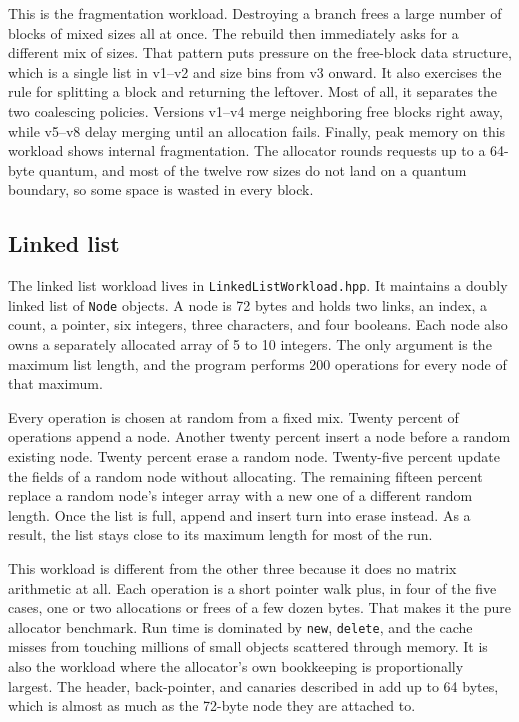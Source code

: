 This is the fragmentation workload.
Destroying a branch frees a large number of blocks of mixed sizes all at once.
The rebuild then immediately asks for a different mix of sizes.
That pattern puts pressure on the free-block data structure, which is a single
list in v1--v2 and size bins from v3 onward.
It also exercises the rule for splitting a block and returning the leftover.
Most of all, it separates the two coalescing policies.
Versions v1--v4 merge neighboring free blocks right away, while v5--v8 delay
merging until an allocation fails.
Finally, peak memory on this workload shows internal fragmentation.
The allocator rounds requests up to a 64-byte quantum, and most of the twelve
row sizes do not land on a quantum boundary, so some space is wasted in every
block.

\subsection{Linked list}

The linked list workload lives in
\texttt{Linked\allowbreak List\allowbreak Workload.hpp}.
It maintains a doubly linked list of \texttt{Node} objects.
A node is 72 bytes and holds two links, an index, a count, a pointer, six
integers, three characters, and four booleans.
Each node also owns a separately allocated array of 5 to 10 integers.
The only argument is the maximum list length, and the program performs 200
operations for every node of that maximum.

Every operation is chosen at random from a fixed mix.
Twenty percent of operations append a node.
Another twenty percent insert a node before a random existing node.
Twenty percent erase a random node.
Twenty-five percent update the fields of a random node without allocating.
The remaining fifteen percent replace a random node's integer array with a new
one of a different random length.
Once the list is full, append and insert turn into erase instead.
As a result, the list stays close to its maximum length for most of the run.

This workload is different from the other three because it does no matrix
arithmetic at all.
Each operation is a short pointer walk plus, in four of the five cases, one or
two allocations or frees of a few dozen bytes.
That makes it the pure allocator benchmark.
Run time is dominated by \texttt{new}, \texttt{delete}, and the cache misses
from touching millions of small objects scattered through memory.
It is also the workload where the allocator's own bookkeeping is proportionally
largest.
The header, back-pointer, and canaries described in
 add up to 64 bytes, which is almost as much as
the 72-byte node they are attached to.

